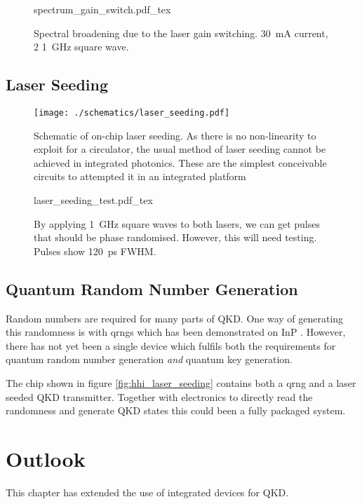 \begin{figure}[tp]
	\centering
	\small	
	\def\svgwidth{0.9\textwidth} 
	{spectrum_gain_switch.pdf_tex}
	\caption[Spectrum of the gain switched laser]{Spectral broadening due to the laser gain switching. \SI{30}{mA} current, \SI{2}{\Vpp} \SI{1}{\GHz} square wave.}
	\label{fig:gain_switch_spectrum}
\end{figure}

\subsection{Laser Seeding}


\begin{figure}[tp]
	\centering
	\texttt{[image: ./schematics/laser\_seeding.pdf]}
	\caption[Schematic of on-chip laser seeding]{Schematic of on-chip laser seeding. As there is no non-linearity to exploit for a circulator, the usual method of laser seeding cannot be achieved in integrated photonics. These are the simplest conceivable circuits to attempted it in an integrated platform}
	\label{fig:las_seed_schem}
\end{figure}


\begin{figure}[tp]
	\centering	
	\def\svgwidth{0.8\textwidth} 
	{laser_seeding_test.pdf_tex}
	\caption[Integrated laser seeding test]{By applying \SI{1}{GHz} square waves to both lasers, we can get pulses that should be phase randomised. However,  this will need testing. Pulses show \SI{120}{ps} \ac{FWHM}.}
	\label{fig:las_seed_test}
\end{figure}

\subsection{Quantum Random Number Generation}

Random numbers are required for many parts of \ac{QKD}. One way of generating this randomness is with \acp{qrng} which has been demonstrated on \ac{InP} \cite{FrancescoThesis,Abellan2016}. However, there has not yet been a single device which fulfils both the requirements for quantum random number generation \textit{and} quantum key generation.

The chip shown in figure \ref{fig:hhi_laser_seeding} contains both a \ac{qrng} and a laser seeded \ac{QKD} transmitter. Together with electronics to directly read the randomness and generate \ac{QKD} states this could been a fully packaged system.

\section{Outlook}

This chapter has extended the use of integrated devices for \acl{QKD}.

